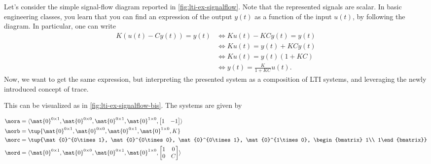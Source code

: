 \begin{example}
    Let's consider the simple signal-flow diagram reported in \cref{fig:lti-ex-signalflow}.
    Note that the represented signals are scalar.
    In basic engineering classes, you learn that you can find an expression of the output $y(t)$ as a function of the input $u(t)$, by following the diagram.
    In particular, one can write
    \begin{equation}
        \label{eq:lti-input-output-gain}
        \begin{aligned}
            K(u(t)-Cy(t))=y(t) & \Leftrightarrow Ku(t)-KCy(t)=y(t) \\
                               & \Leftrightarrow Ku(t)=y(t)+KCy(t) \\
                               & \Leftrightarrow Ku(t)=y(t)(1+KC) \\
                               & \Leftrightarrow y(t)=\frac{K}{1+KC}u(t).
        \end{aligned}
    \end{equation}
    Now, we want to get the same expression, but interpreting the presented system as a composition of LTI systems, and leveraging the newly introduced concept of trace.

    This can be visualized as in \cref{fig:lti-ex-signalflow-bis}.
    The systems are given by

    \begin{equation*}
        \begin{aligned}
            \mora & = \langle\mat{0}^{0\times 1}, \mat{0}^{0\times 0}, \mat{0}^{0\times 1}, \mat{0}^{1\times 0}, \begin{bmatrix} {1} & {-1}\end{bmatrix}\rangle \\
            \morb & =\tup{\mat{0}^{0\times 1}, \mat{0}^{0\times 0}, \mat{0}^{0\times 1}, \mat{0}^{1\times 0}, K} \\
            \morc & =\tup{\mat{0}^{0\times 1}, \mat{0}^{0\times 0}, \mat{0}^{0\times 1}, \mat{0}^{1\times 0}, \begin{bmatrix} 1\\ 1\end{bmatrix}} \\
            \mord & =\langle\mat{0}^{0\times 1}, \mat{0}^{0\times 0}, \mat{0}^{0\times 1}, \mat{0}^{1\times 0},
            \begin{bmatrix}
                1 & 0 \\
                0 & C
            \end{bmatrix}\rangle
        \end{aligned}
    \end{equation*}


\end{example}
